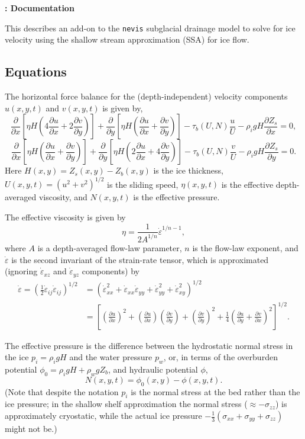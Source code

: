 \documentclass[a4paper,11pt,fleqn]{article}
\title{}
\author{I J Hewitt}
\date{\today}
\newcommand{\be}{\begin{equation} }
\newcommand{\ee}{\end{equation}}
\newcommand{\eps}{\varepsilon}
\newcommand{\pd}[2]{\frac{\partial #1}{\partial #2}}
\newcommand{\half}{\mbox{$\frac{1}{2}$}}
\begin{document}
\thispagestyle{first}

{\setlength{\parskip}{-5pt}
{\Large \bf {}: Documentation
} \setlength{\parskip}{5pt}

{This describes an add-on to the {\verb|nevis|} subglacial drainage model to solve for ice velocity using the shallow stream approximation (SSA) for ice flow.}

\subsection*{Equations}

The horizontal force balance for the (depth-independent) velocity components $u(x,y,t)$ and $v(x,y,t)$ is given by,
\be
\pd{}{x} \left[ \eta H \left( 4 \pd{u}{x} + 2 \pd{v}{y} \right)  \right]+ \pd{}{y} \left[ \eta H \left( \pd{u}{x} + \pd{v}{y} \right)\right] - \tau_b(U,N) \frac{u}{U} - \rho_i g H \pd{Z_s}{x} = 0,
\ee
\be
\pd{}{x} \left[ \eta H \left( \pd{u}{x} + \pd{v}{y} \right)  \right]+ \pd{}{y} \left[ \eta H \left( 2 \pd{u}{x} + 4 \pd{v}{y} \right) \right] - \tau_b(U,N) \frac{v}{U} - \rho_i g H \pd{Z_s}{y} = 0.
\ee
Here $H(x,y) = Z_s(x,y)-Z_b(x,y)$ is the ice thickness, $U(x,y,t) = (u^2+v^2)^{1/2}$ is the sliding speed, $\eta(x,y,t)$ is the effective depth-averaged viscosity, and $N(x,y,t)$ is the effective pressure.

The effective viscosity is given by
\be
\eta = \frac{1}{2A^{1/n}} \dot{\eps}^{1/n-1},
\ee
where $A$ is a depth-averaged flow-law parameter, $n$ is the flow-law exponent, and $\dot{\eps}$ is the second invariant of the strain-rate tensor, which is approximated (ignoring $\dot{\eps}_{xz}$ and $\dot{\eps}_{yz}$ components) by
\be
\begin{split}
\dot{\eps} = \left( \half \dot{\eps}_{ij} \dot{\eps}_{ij} \right)^{1/2} & = \left( \dot{\eps}_{xx}^2 + \dot{\eps}_{xx}\dot{\eps}_{yy} + \dot{\eps}_{yy}^2 + \dot{\eps}_{xy}^2  \right)^{1/2}  \\ & =  \left[ \left(\pd{u}{x}\right)^2 + \left(\pd{u}{x}\right)\left(\pd{v}{y}\right) +\left(\pd{v}{y}\right)^2 + \frac{1}{4}\left(\pd{u}{y}+\pd{v}{x}\right)^2  \right]^{1/2}.
\end{split}
\ee

The effective pressure is the difference between the hydrostatic normal stress in the ice $p_i = \rho_i g H$ and the water pressure $p_w$, or, in terms of the overburden potential $\phi_0 = \rho_i g H + \rho_w g Z_b$, and hydraulic potential $\phi$, 
\be
N(x,y,t) = \phi_0(x,y) - \phi(x,y,t).
\ee
(Note that despite the notation $p_i$ is the normal stress at the bed rather than the ice pressure; in the shallow shelf approximation the normal stress ($\approx -\sigma_{zz}$) is approximately cryostatic, while the actual ice pressure $-\mbox{$\frac{1}{3}$}(\sigma_{xx}+\sigma_{yy}+\sigma_{zz})$ might not be.)

}
\end{document}
